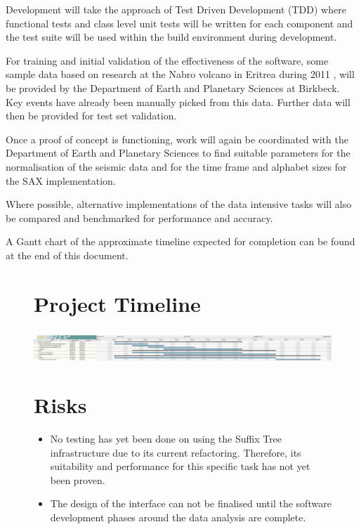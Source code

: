 \documentclass[11pt, a4paper]{scrartcl}
\begin{document}
	Development will take the approach of Test Driven Development (TDD) where functional tests and class level unit tests will be written for each component and the test suite will be used within the build environment during development.  
	
	For training and initial validation of the effectiveness of the software, some sample data based on research at the Nabro volcano in Eritrea during 2011 \citep{eritrea1}, \citep{eritrea2} will be provided by the Department of Earth and Planetary Sciences at Birkbeck.  Key events have already been manually picked from this data.  Further data will then be provided for test set validation.
	
	Once a proof of concept is functioning, work will again be coordinated with the Department of Earth and Planetary Sciences to find suitable parameters for the normalisation of the seismic data and for the time frame and alphabet sizes for the SAX implementation.
	
	Where possible, alternative implementations of the data intensive tasks will also be compared and benchmarked for performance and accuracy.
	
	A Gantt chart of the approximate timeline expected for completion can be found at the end of this document.

\listoffigures




\newpage
\appendix

\begin{figure}
\section{Project Timeline}
	\includegraphics[scale=0.2]{plan.png}
\section{Risks}
	\begin{itemize}
		\item No testing has yet been done on using the Suffix Tree infrastructure due to its current refactoring.  Therefore, its suitability and performance for this specific task has not yet been proven.
		\item The design of the interface can not be finalised until the software development phases around the data analysis are complete.
	\end{itemize}
\end{figure}
\end{document}
